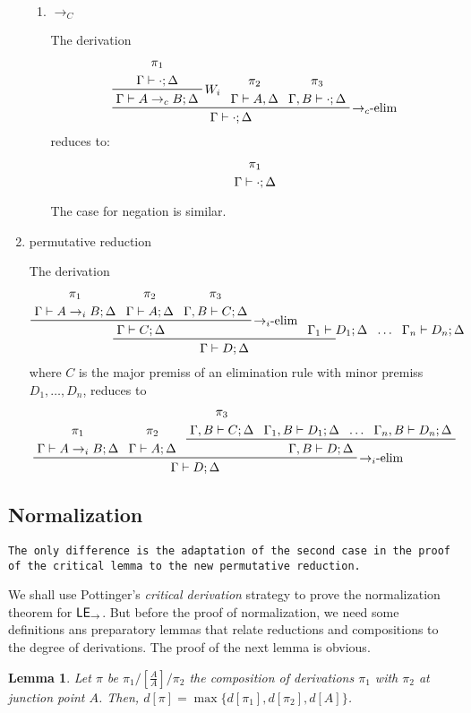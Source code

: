 \documentclass{article}
\newcommand{\lei}{$\text{\sffamily{LE}}_{\to}$}
\newcommand{\efc}{$\to_c$-elim}
\newcommand{\efi}{$\to_i$-elim}
\newcommand{\comp}[1]{[\tfrac{#1}{#1}]}
\newtheorem{lemma}{Lemma}
\begin{document}
\begin{enumerate}
\begin{enumerate}
  \item $\to_C$

    The derivation
    \[\prftree[r]{\efc{}}{
        \prftree[r]{$W_i$}{
          \prftree[noline]{\pi_1}{\Gamma\vdash \cdot; \Delta}}{
          \Gamma\vdash A\to_c B; \Delta}}{
        \prftree[noline]{\pi_2}{\Gamma\vdash A, \Delta}}{
        \prftree[noline]{\pi_3}{\Gamma, B\vdash \cdot; \Delta}}{
        \Gamma\vdash \cdot; \Delta}\]
    reduces to:
    \[\prftree[noline]{\pi_1}{\Gamma\vdash\cdot; \Delta}\]

    The case for negation is similar.
  \end{enumerate}

\item permutative reduction

  The derivation
  \[\prftree{
      \prftree[r]{\efi{}}{
        \prftree[noline]{\pi_1}{\Gamma\vdash A\to_i B; \Delta}}{
        \prftree[noline]{\pi_2}{\Gamma\vdash A; \Delta}}{
        \prftree[noline]{\pi_3}{\Gamma, B\vdash C; \Delta}}{
        \Gamma\vdash C; \Delta}}{
      \Gamma_1\vdash D_1; \Delta}{
      \dots}{
      \Gamma_n\vdash D_n; \Delta}{
      \Gamma\vdash D; \Delta}
  \]
  where $C$ is the major premiss of an elimination rule with minor premiss $D_1, \dots, D_n$, reduces to
  \[\prftree[r]{\efi{}}{
      \prftree[noline]{\pi_1}{\Gamma\vdash A\to_i B; \Delta}}{
      \prftree[noline]{\pi_2}{\Gamma\vdash A; \Delta}}{
      \prftree{
        \prftree[noline]{\pi_3}{\Gamma, B\vdash C; \Delta}}{
        \Gamma_1, B\vdash D_1; \Delta}{
        \dots}{
        \Gamma_n, B\vdash D_n; \Delta}{
        \Gamma, B\vdash D; \Delta}}{
      \Gamma\vdash D; \Delta}\]
\end{enumerate}
\normalfont{}

\subsection{Normalization}

\texttt{The only difference is the adaptation of the second case in the proof of the critical lemma to the new permutative reduction.}

We shall use Pottinger's \emph{critical derivation} strategy to prove the normalization theorem for \lei{}. But before the proof of normalization, we need some definitions ans preparatory lemmas that relate reductions and compositions to the degree of derivations. The proof of the next lemma is obvious.

\begin{lemma}\label{lemma:comp_deg}
  Let $\pi$ be $\pi_1/\comp{A}/\pi_2$ the composition of derivations $\pi_1$ with $\pi_2$ at junction point $A$. Then, $d[\pi] = \max\{d[\pi_1], d[\pi_2], d[A]\}$.
\end{lemma}
\end{document}
